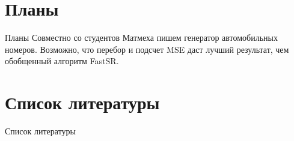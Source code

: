 \section{Планы}
\begin{frame}{Планы}
  Совместно со студентов Матмеха пишем генератор автомобильных номеров. Возможно, что перебор и подсчет MSE даст лучший
  результат, чем обобщенный алгоритм FastSR.
\end{frame}

\section{Список литературы}
\begin{frame}[allowframebreaks]{Список литературы}
\nocite{suresh2007superresolution}
\nocite{tian2011survey}
\nocite{gonzalez2002woods}


\end{frame}
